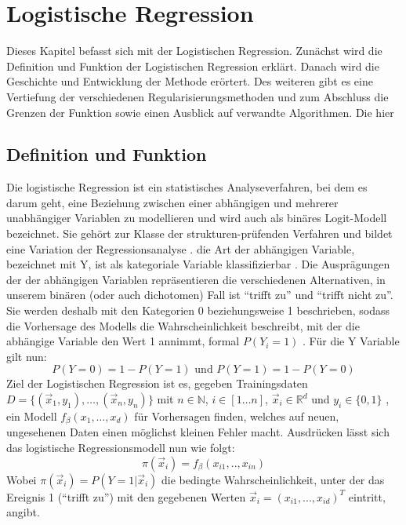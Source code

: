 \chapter{Logistische Regression}
Dieses Kapitel befasst sich mit der Logistischen Regression. Zunächst wird die Definition und Funktion der Logistischen Regression erklärt. Danach wird die Geschichte und Entwicklung der Methode erörtert. Des weiteren gibt es eine Vertiefung der verschiedenen Regularisierungsmethoden und zum Abschluss die Grenzen der Funktion sowie einen Ausblick auf verwandte Algorithmen. Die hier 
\section{Definition und Funktion}
Die logistische Regression ist ein statistisches Analyseverfahren, bei dem es darum geht, eine Beziehung zwischen einer abhängigen und mehrerer unabhängiger Variablen zu modellieren und wird auch als binäres Logit-Modell bezeichnet. Sie gehört zur Klasse der strukturen-prüfenden Verfahren und bildet eine Variation der Regressionsanalyse \cite{BECK}.
die Art der abhängigen Variable, bezeichnet mit Y, ist als kategoriale Variable klassifizierbar \cite{ROHR}. Die Ausprägungen der der abhängigen Variablen repräsentieren die verschiedenen Alternativen, in unserem binären (oder auch dichotomen) Fall ist "`trifft zu"' und "`trifft nicht zu"'. Sie werden deshalb mit den Kategorien 0 beziehungsweise 1 beschrieben, sodass die Vorhersage des Modells die Wahrscheinlichkeit beschreibt, mit der die abhängige Variable den Wert 1 annimmt, formal $P(Y_i=1)$ \cite{BECK}.
Für die Y Variable gilt nun: 
\begin{displaymath}
P(Y=0)=1-P(Y=1)\text{ und } P(Y=1)=1-P(Y=0)
\end{displaymath}
Ziel der Logistischen Regression ist es, gegeben Trainingsdaten 
$D = \{(\vec x_1 , y_1), \dots , (\vec x_n ,y_n)\}$ mit $n \in 	\mathbb{N}$, $i \in [1 \dots n] $, $\vec x_i \in \mathbb R^d$ und $y_i \in 
\{0,1\}$ , ein Modell $f_{\beta}(x_1, \dots ,x_d)$ für Vorhersagen finden, 
welches auf neuen, ungesehenen Daten einen möglichst kleinen Fehler macht.
Ausdrücken lässt sich das logistische Regressionsmodell nun wie folgt:
\begin{displaymath}
\pi(\vec x_i) = f_{\beta}(x_{i1},..,x_{in})
\end{displaymath}
Wobei $\pi(\vec x_i)=P(Y=1|\vec x_i)$ die bedingte Wahrscheinlichkeit, unter der das Ereignis 1 ("`trifft zu"') mit den gegebenen Werten $\vec x_i = (x_{i1},...,x_{id})^{T}$ eintritt, angibt.\\
